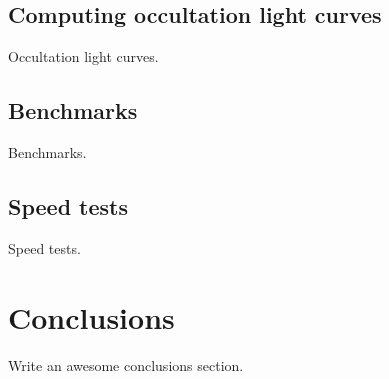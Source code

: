 \documentclass[modern]{aastex61}
\begin{document}
\subsection{Computing occultation light curves}
\label{sec:starryoccultation}

Occultation light curves.

\subsection{Benchmarks}
\label{sec:starrybenchmarks}

Benchmarks.

\subsection{Speed tests}
\label{sec:starryspeed}

Speed tests.

\pagebreak
\section{Conclusions}
\label{sec:conclusions}

Write an awesome conclusions section.

%


\pagebreak
\appendix
\end{document}
